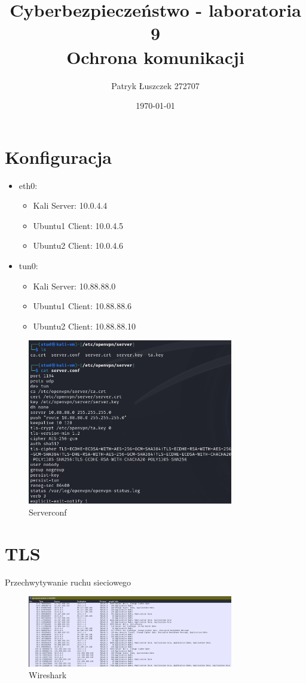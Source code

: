 \documentclass{article}
\title{%
  Cyberbezpieczeństwo - laboratoria 9 \\
  \large Ochrona komunikacji}
\author{Patryk Łuszczek 272707}
\date{\today}
\begin{document}
\maketitle
\newpage


\section*{Konfiguracja}

\begin{itemize}
  \item eth0:
        \begin{itemize}
          \item Kali Server: 10.0.4.4
          \item Ubuntu1 Client: 10.0.4.5
          \item Ubuntu2 Client: 10.0.4.6
        \end{itemize}
  \item tun0:
        \begin{itemize}
          \item Kali Server: 10.88.88.0
          \item Ubuntu1 Client: 10.88.88.6
          \item Ubuntu2 Client: 10.88.88.10
        \end{itemize}
\end{itemize}


\begin{figure}[H]
  \centering
  \includegraphics[width=0.8\textwidth]{1_zawartosc_serverconf.png}
  \caption{Serverconf}
\end{figure}


\section{TLS}
Przechwytywanie ruchu sieciowego
\begin{figure}[H]
  \centering
  \includegraphics[width=0.8\textwidth]{4_filtrtslssl.png}
  \caption{Wireshark}
\end{figure}
\end{document}
